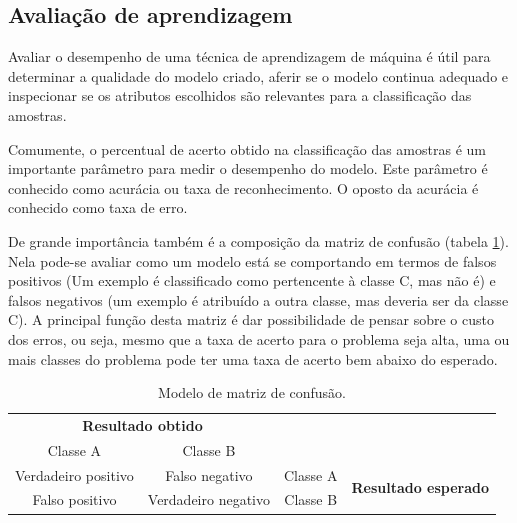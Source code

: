 \subsection{Avaliação de aprendizagem}\label{sec:avaliacao}

Avaliar o desempenho de uma técnica de aprendizagem de máquina é útil para determinar a qualidade do modelo criado, aferir se o modelo continua adequado e inspecionar se os atributos escolhidos são relevantes para a classificação das amostras.

Comumente, o percentual de acerto obtido na classificação das amostras é um importante parâmetro para medir o desempenho do modelo. Este parâmetro é conhecido como acurácia ou taxa de reconhecimento. O oposto da acurácia é conhecido como taxa de erro.

De grande importância também é a composição da matriz de confusão (tabela \ref{tab:matrixConfusao}). Nela pode-se avaliar como um modelo está se comportando em termos de falsos positivos (Um exemplo é classificado como pertencente à classe C, mas não é) e falsos negativos (um exemplo é atribuído a outra classe, mas deveria ser da classe C). A principal função desta matriz é dar possibilidade de pensar sobre o custo dos erros, ou seja, mesmo que a taxa de acerto para o problema seja alta, uma ou mais classes do problema pode ter uma taxa de acerto bem abaixo do esperado.

\begin{table}[h]
  \centering
  \begin{tabular}{cccc}
  \multicolumn{2}{c}{\textbf{Resultado obtido}}                  &                               &                                              \\ \cline{1-2}
  \multicolumn{1}{|c|}{Classe A} & \multicolumn{1}{c|}{Classe B} &                               &                                              \\ \cline{1-3}
  \multicolumn{1}{|c|}{Verdadeiro positivo}       & \multicolumn{1}{c|}{Falso negativo}       & \multicolumn{1}{c|}{Classe A} & \multirow{2}{*}{\textbf{Resultado esperado}} \\ \cline{1-3}
  \multicolumn{1}{|c|}{Falso positivo}       & \multicolumn{1}{c|}{Verdadeiro negativo}       & \multicolumn{1}{c|}{Classe B} &                                              \\ \cline{1-3}
  \end{tabular}
  \caption{Modelo de matriz de confusão.}
  \label{tab:matrixConfusao}
\end{table}

